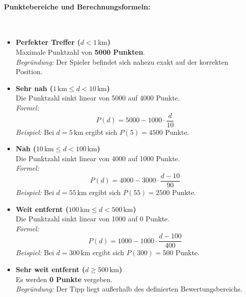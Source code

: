 \paragraph{Punktebereiche und Berechnungsformeln: }
\mbox{}\\
\begin{itemize}
  \item \textbf{Perfekter Treffer ($d < 1\,\text{km}$)}\\
  Maximale Punktzahl von \textbf{5000 Punkten}.\\
  \emph{Begründung:} Der Spieler befindet sich nahezu exakt auf der korrekten Position.

  \item \textbf{Sehr nah ($1\,\text{km} \leq d < 10\,\text{km}$)}\\
  Die Punktzahl sinkt linear von 5000 auf 4000 Punkte.\\
  \emph{Formel:}
  \[
    P(d) = 5000 - 1000 \cdot \frac{d}{10}
  \]
  \emph{Beispiel:} Bei $d = 5\,\text{km}$ ergibt sich $P(5) = 4500$ Punkte.

  \item \textbf{Nah ($10\,\text{km} \leq d < 100\,\text{km}$)}\\
  Die Punktzahl sinkt linear von 4000 auf 1000 Punkte.\\
  \emph{Formel:}
  \[
    P(d) = 4000 - 3000 \cdot \frac{d - 10}{90}
  \]
  \emph{Beispiel:} Bei $d = 55\,\text{km}$ ergibt sich $P(55) = 2500$ Punkte.

  \item \textbf{Weit entfernt ($100\,\text{km} \leq d < 500\,\text{km}$)}\\
  Die Punktzahl sinkt linear von 1000 auf 0 Punkte.\\
  \emph{Formel:}
  \[
    P(d) = 1000 - 1000 \cdot \frac{d - 100}{400}
  \]
  \emph{Beispiel:} Bei $d = 300\,\text{km}$ ergibt sich $P(300) = 500$ Punkte.

  \item \textbf{Sehr weit entfernt ($d \geq 500\,\text{km}$)}\\
  Es werden \textbf{0 Punkte} vergeben.\\
  \emph{Begründung:} Der Tipp liegt außerhalb des definierten Bewertungsbereichs.
\end{itemize}

